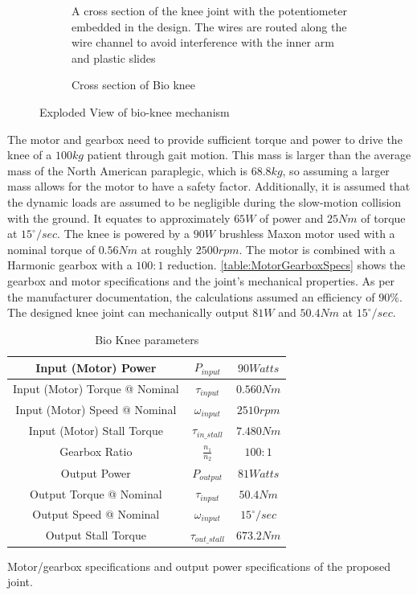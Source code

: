\begin{figure}
\begin{subfigure}{\textwidth}
          \captionsetup{justification=centering}
        \caption{Cross section of Bio knee}{A cross section of the knee joint with the potentiometer embedded in the design. The wires are routed along the wire channel to avoid interference with the inner arm and plastic slides}
        \label{fig:CrossSectionPot}
    \end{subfigure}    
    \caption{Exploded View of bio-knee mechanism}
    \label{fig:bioknee}
\end{figure}

The motor and gearbox need to provide sufficient torque and power to drive the knee of a $100kg$ patient through gait motion. This mass is larger than the average mass of the North American paraplegic, which is $68.8kg$, so assuming a larger mass allows for the motor to have a safety factor. Additionally, it is assumed that the dynamic loads are assumed to be negligible during the slow-motion collision with the ground. It equates to approximately $65W$ of power and $25Nm$ of torque at \(15^\circ/sec\). The knee is powered by a $90W$ brushless Maxon motor used with a nominal torque of $0.56Nm$ at roughly $2500rpm$. The motor is combined with a Harmonic gearbox with a $100:1$ reduction. \autoref{table:MotorGearboxSpecs} shows the gearbox and motor specifications and the joint's mechanical properties. As per the manufacturer documentation, the calculations assumed an efficiency of \(90\%\). The designed knee joint can mechanically output $81W$ and $50.4Nm$ at $15^\circ/sec$.  

\begin{table}
    \centering
    \begin{tabular}{||c|c|c||}
        \hline
        Input (Motor) Power & \(P_{input}\) & \(90 Watts\) \\
        \hline
        Input (Motor) Torque @ Nominal & \(\tau_{input}\) & \(0.560 Nm\) \\
        \hline
        Input (Motor) Speed @ Nominal & \(\omega_{input}\) & \(2510 rpm\) \\
        \hline
        Input (Motor) Stall Torque & \(\tau_{in\_stall}\) & \(7.480 Nm\) \\
        \hline \hline
        Gearbox Ratio & \(\frac{n_1}{n_2}\) & \(100:1\) \\
        \hline \hline
        Output Power & \(P_{output}\) & \(81 Watts\) \\
        \hline
        Output Torque @ Nominal & \(\tau_{input}\) & \(50.4 Nm\) \\
        \hline
        Output Speed @ Nominal & \(\omega_{input}\) & \(15^\circ/sec\) \\
        \hline
        Output Stall Torque & \(\tau_{out\_stall}\) & \(673.2 Nm\) \\
        \hline
    \end{tabular}
    \caption{Bio Knee parameters}{Motor/gearbox specifications and output power specifications of the proposed joint.}
    \label{table:MotorGearboxSpecs}
\end{table}

